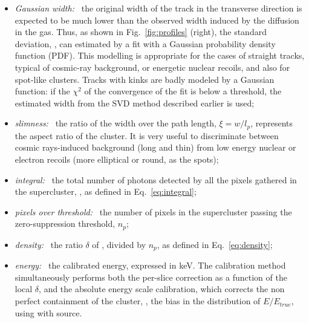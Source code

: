 \begin{itemize}
  \item \textit{Gaussian width:~} the original width of the track in
    the transverse direction is expected to be much lower than the
    observed width induced by the diffusion in the gas. Thus, as shown
    in Fig.~\ref{fig:profiles} (right), the standard
    deviation, \tsigmag, can estimated by a fit with a Gaussian
    probability density function (PDF). This modelling is appropriate
    for the cases of straight tracks, typical of cosmic-ray
    background, or energetic nuclear recoils, and also for spot-like
    clusters. Tracks with kinks are badly modeled by a Gaussian
    function: if the $\chi^2$ of the convergence of the fit is below a
    threshold, the estimated width from the SVD method described
    earlier is used;

  \item \textit{slimness:~} the ratio of the width over the path
    length, $\xi=w/l_p$, represents the aspect ratio of the
    cluster. It is very useful to discriminate between cosmic
    rays-induced background (long and thin) from low energy nuclear or
    electron recoils (more elliptical or round, as the \fe spots);
    
  \item \textit{integral:~} the total number of photons detected by all the
  pixels gathered in the supercluster, \isclu, as defined in
  Eq.~\ref{eq:integral};

  \item \textit{pixels over threshold:~} the number of pixels in the
  supercluster passing the zero-suppression threshold, $n_p$;

  \item \textit{density:~} the ratio $\delta$ of \isclu, divided by
  $n_p$, as defined in Eq.~\ref{eq:density};

  \item \textit{energy:~} the calibrated energy, expressed in keV. The
    calibration method simultaneously performs both the per-slice
    correction as a function of the local $\delta$, and the absolute
    energy scale calibration, which corrects the non perfect
    containment of the cluster, \ie, the bias in the distribution of
    $E/E_{true}$, using with \fe source.
\end{itemize}

